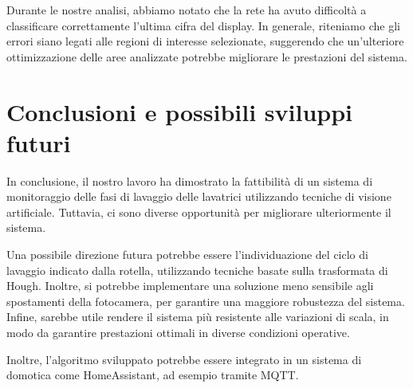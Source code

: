 \documentclass{article}
\begin{document}
\par Durante le nostre analisi, abbiamo notato che la rete ha avuto
difficoltà a classificare correttamente l'ultima cifra del display. In
generale, riteniamo che gli errori siano legati alle regioni di
interesse selezionate, suggerendo che un'ulteriore ottimizzazione delle
aree analizzate potrebbe migliorare le prestazioni del sistema.

\section{Conclusioni e possibili sviluppi
futuri}\label{conclusioni-e-possibili-sviluppi-futuri}

\par In conclusione, il nostro lavoro ha dimostrato la fattibilità di un
sistema di monitoraggio delle fasi di lavaggio delle lavatrici
utilizzando tecniche di visione artificiale. Tuttavia, ci sono diverse
opportunità per migliorare ulteriormente il sistema.

\par Una possibile direzione futura potrebbe essere l'individuazione del
ciclo di lavaggio indicato dalla rotella, utilizzando tecniche basate
sulla trasformata di Hough. Inoltre, si potrebbe implementare una
soluzione meno sensibile agli spostamenti della fotocamera, per
garantire una maggiore robustezza del sistema. Infine, sarebbe utile
rendere il sistema più resistente alle variazioni di scala, in modo da
garantire prestazioni ottimali in diverse condizioni operative.

\par Inoltre, l'algoritmo sviluppato potrebbe essere integrato in un
sistema di domotica come HomeAssistant, ad esempio tramite MQTT.


\end{document}
